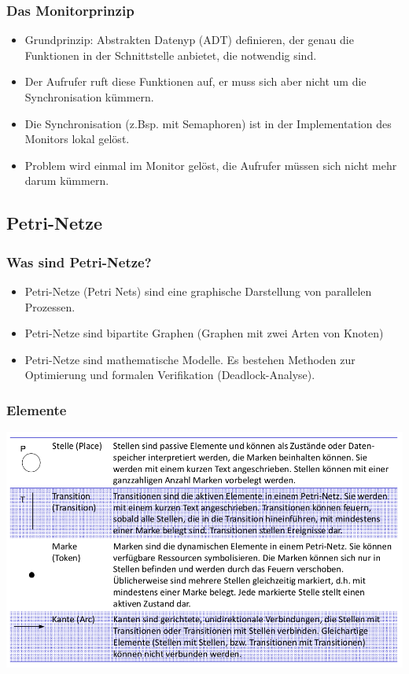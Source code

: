  \subsubsection{Das Monitorprinzip}
 \begin{itemize}
   \item Grundprinzip: Abstrakten Datenyp (ADT) definieren, der genau die Funktionen
   in der Schnittstelle anbietet, die notwendig sind. 
   \item Der Aufrufer ruft diese Funktionen auf, er muss sich aber nicht um die
   Synchronisation kümmern. 
   \item Die Synchronisation (z.Bsp. mit Semaphoren) ist in der Implementation des
   Monitors lokal gelöst. 
   \item Problem wird einmal im Monitor gelöst, die Aufrufer müssen sich nicht
   mehr darum kümmern. 
 \end{itemize}


\subsection{Petri-Netze}
\subsubsection{Was sind Petri-Netze?}
\begin{itemize}
\item Petri-Netze (Petri Nets) sind eine graphische Darstellung von parallelen Prozessen.
\item Petri-Netze sind bipartite Graphen (Graphen mit zwei Arten von Knoten)
\item Petri-Netze sind mathematische Modelle. Es bestehen Methoden zur
Optimierung und formalen Verifikation (Deadlock-Analyse).
\end{itemize}
\subsubsection{Elemente}
\includegraphics[width=15cm]{images/Concurrency/PetriNetzeElemente}
\newpage
